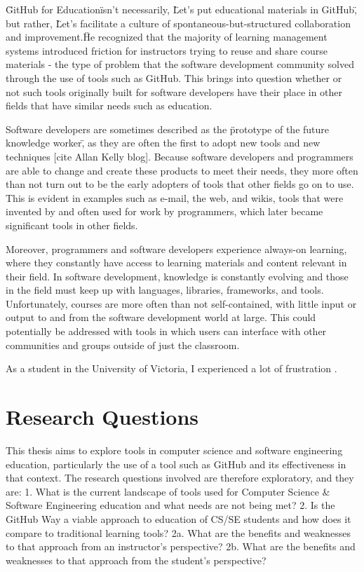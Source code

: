 \"GitHub for Education\" isn’t necessarily, \"Let’s put educational materials in GitHub\", but rather, \"Let’s facilitate a culture of spontaneous-but-structured collaboration and improvement.\"

He recognized that the majority of learning management systems introduced friction for instructors trying to reuse and share course materials - the type of problem that the software development community solved through the use of tools such as GitHub. This brings into question whether or not such tools originally built for software developers have their place in other fields that have similar needs such as education.

Software developers are sometimes described as the \"prototype of the future knowledge worker\", as they are often the first to adopt new tools and new techniques [cite Allan Kelly blog]. Because software developers and programmers are able to change and create these products to meet their needs, they more often than not turn out to be the early adopters of tools that other fields go on to use. This is evident in examples such as e-mail, the web, and wikis, tools that were invented by and often used for work by programmers, which later became significant tools in other fields.


Moreover, programmers and software developers experience always-on learning, where they constantly have access to learning materials and content relevant in their field. In software development, knowledge is constantly evolving and those in the field must keep up with languages, libraries, frameworks, and tools. Unfortunately, courses are more often than not self-contained, with little input or output to and from the software development world at large. This could potentially be addressed with tools in which users can interface with other communities and groups outside of just the classroom.

As a student in the University of Victoria, I experienced a lot of frustration .

\section{Research Questions}
This thesis aims to explore tools in computer science and software engineering education, particularly the use of a tool such as GitHub and its effectiveness in that context. The research questions involved are therefore exploratory, and they are:
1. What is the current landscape of tools used for Computer Science & Software Engineering education and what needs are not being met?
2. Is the GitHub Way a viable approach to education of CS/SE students and how does it compare to traditional learning tools?
2a. What are the benefits and weaknesses to that approach from an instructor's perspective?
2b. What are the benefits and weaknesses to that approach from the student's perspective?

